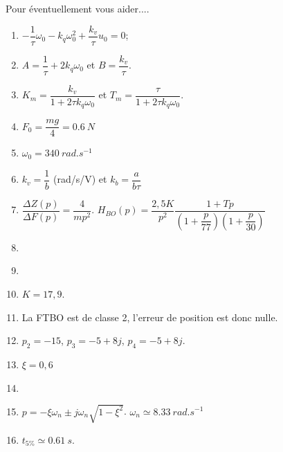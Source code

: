 \documentclass[10pt,fleqn]{article} %
\begin{document}
\begin{multicols}{2}
Pour éventuellement vous aider....
\begin{enumerate}
\item $-\dfrac{1}{\tau}\omega_0 - k_q \omega_0^2 + \dfrac{k_v}{\tau}u_0=0$;
\item $A=\dfrac{1}{\tau}+2k_q\omega_0$ et $B=\dfrac{k_v}{\tau}$.
\item $K_m=\dfrac{k_v}{1+2\tau k_q \omega_0}$ et $T_m=\dfrac{\tau}{1+2\tau k_q \omega_0}$.
\item $F_0=\dfrac{mg}{4}=\SI{0,6}{N}$
\item $\omega_0=\SI{340}{rad.s^{-1}}$
\item $k_v=\dfrac{1}{b}$ (rad/s/V) et $k_b=\dfrac{a}{b\tau}$
\item $\dfrac{\Delta Z(p)}{\Delta F(p)}=\dfrac{4}{mp^2}$. $H_{BO}(p)=\dfrac{2,5 K}{p^2}\dfrac{1+Tp}{\left( 1+\dfrac{p}{77}\right)\left(1+\dfrac{p}{30} \right)}$ 
\item  $\quad$
\item $\quad$
\item $K=17,9$.
\item La FTBO est de classe 2, l'erreur de position est donc nulle.
\item $p_2=-15$, $p_3 = -5+8j$, $p_4=-5+8j$.
\item $\xi=0,6$
\item $\quad$
\item $p=-\xi\omega_n \pm j\omega_n \sqrt{1-\xi^2}$. $\omega_n\simeq \SI{8,33}{rad.s^{-1}}$
\item $t_{5\%}\simeq \SI{0,61}{ s}$. 
\end{enumerate}
\end{multicols}
\end{document}

